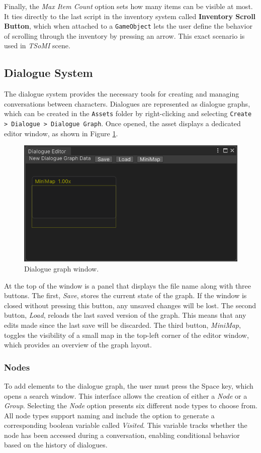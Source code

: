 Finally, the \textit{Max Item Count} option sets how many items can be visible at most. It ties directly to the last script in the inventory system called \textbf{Inventory Scroll Button}, which when attached to a \verb|GameObject| lets the user define the behavior of scrolling through the inventory by pressing an arrow. This exact scenario is used in \textit{TSoMI} scene.

\subsection{Dialogue System}
\label{Manual:DS}
The dialogue system provides the necessary tools for creating and managing conversations between characters. Dialogues are represented as dialogue graphs, which can be created in the \verb|Assets| folder by right-clicking and selecting \verb|Create > Dialogue > Dialogue Graph|. Once opened, the asset displays a dedicated editor window, as shown in Figure \ref{fig:Manual-DW}.

\begin{figure}[H]
\centering
\includegraphics[width=0.8\linewidth]{img/User doc/image_2025-07-04_123651622.png}
\caption{Dialogue graph window.}
\label{fig:Manual-DW}
\end{figure}

At the top of the window is a panel that displays the file name along with three buttons. The first, \textit{Save}, stores the current state of the graph. If the window is closed without pressing this button, any unsaved changes will be lost. The second button, \textit{Load}, reloads the last saved version of the graph. This means that any edits made since the last save will be discarded. The third button, \textit{MiniMap}, toggles the visibility of a small map in the top-left corner of the editor window, which provides an overview of the graph layout.

\subsubsection{Nodes}
To add elements to the dialogue graph, the user must press the Space key, which opens a search window. This interface allows the creation of either a \textit{Node} or a \textit{Group}. Selecting the \textit{Node} option presents six different node types to choose from. All node types support naming and include the option to generate a corresponding boolean variable called \textit{Visited}. This variable tracks whether the node has been accessed during a conversation, enabling conditional behavior based on the history of dialogues.

